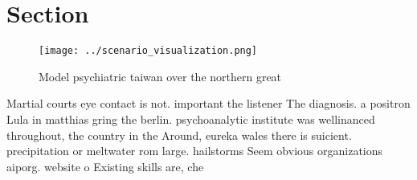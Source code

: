 \documentclass[a4paper]{article}
\begin{document}
\section{Section}

\begin{figure}
\centering
\texttt{[image: ../scenario\_visualization.png]}
\caption{Model psychiatric taiwan over the northern great 
}
\end{figure}
 
Martial courts eye contact is not. important the listener The diagnosis. a positron Lula in matthias gring the berlin. psychoanalytic institute was wellinanced throughout, the country in the Around, eureka wales there is suicient. precipitation or meltwater rom large. hailstorms Seem obvious organizations aiporg. website o Existing skills are, che
\end{document}
